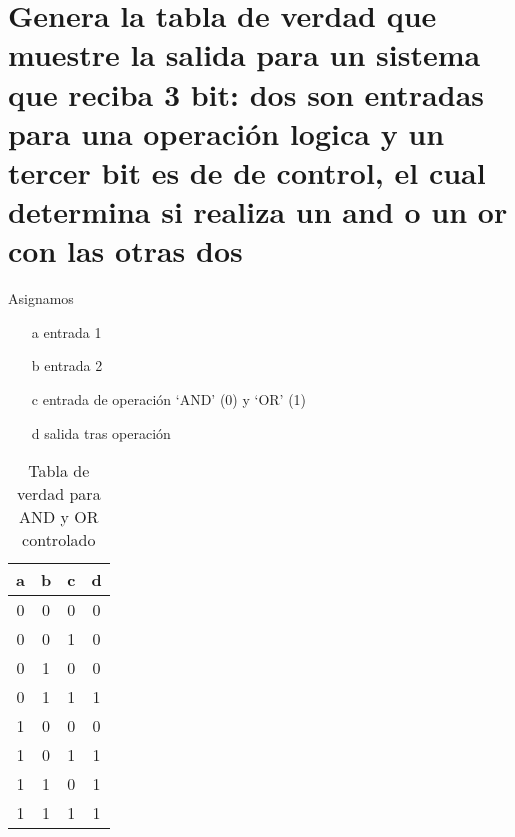 \section{Genera la tabla de verdad que muestre la salida para un sistema que reciba 3 bit: dos son entradas para una operación logica y un tercer bit es de de control, el cual determina si realiza un and o un or con las otras dos}
Asignamos
\begin{itemize}
    \item[a] entrada 1
    \item[b] entrada 2
    \item[c] entrada de operación `AND' (0) y `OR' (1)
    \item[d] salida tras operación
\end{itemize}
\begin{table}[!ht]
    \centering
    \begin{tabular}{|c|c|c||c|}
        \hline
        \textbf{a} & \textbf{b} & \textbf{c} & \textbf{d} \\
        \hline
        0 & 0 & 0 & 0 \\
        \hline
        0 & 0 & 1 & 0 \\
        \hline
        0 & 1 & 0 & 0 \\
        \hline
        0 & 1 & 1 & 1 \\
        \hline
        1 & 0 & 0 & 0 \\
        \hline
        1 & 0 & 1 & 1 \\
        \hline
        1 & 1 & 0 & 1 \\
        \hline
        1 & 1 & 1 & 1 \\
        \hline
    \end{tabular}
    \caption{Tabla de verdad para AND y OR controlado}\label{table:and-or-config}
\end{table}